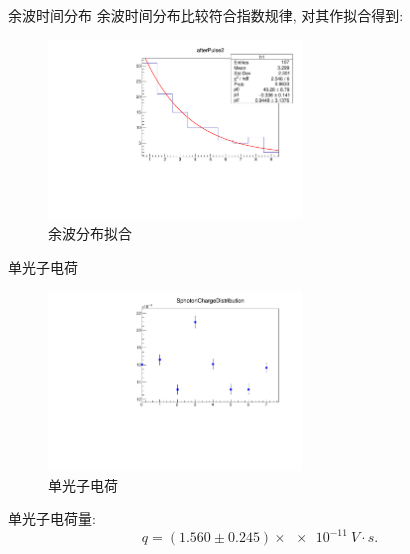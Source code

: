 \documentclass[10pt]{beamer}
\begin{document}
\begin{frame}[label={sec:org60cad64}]{余波时间分布}
余波时间分布比较符合指数规律, 对其作拟合得到:

\begin{figure}[htbp]
\centering
\includegraphics[width=0.6\textwidth]{../../img/afterPulse02r.pdf}
\caption{余波分布拟合}
\end{figure}
\end{frame}

\begin{frame}[label={sec:orgb3c9fe6}]{单光子电荷}
\begin{figure}[htbp]
\centering
\includegraphics[width=0.6\textwidth]{../../DetectorPerform/SPhoton/SphotonCharge.pdf}
\caption{单光子电荷}
\end{figure}

单光子电荷量:
\begin{equation}
\label{eq:6}
q = (1.560 \pm 0.245)\times\qty{e-11}{V\cdot s}.
\end{equation}
\end{frame}
\end{document}
